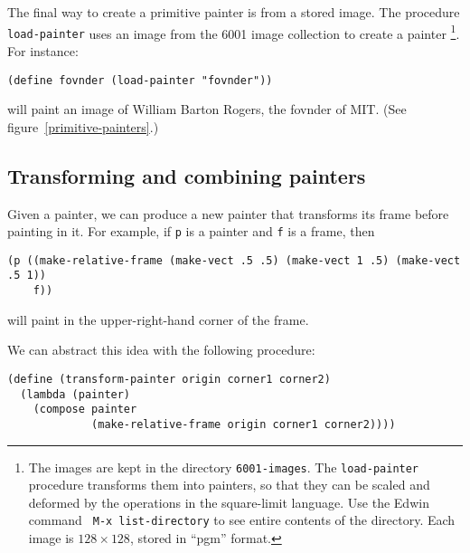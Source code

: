 The final way to create a primitive painter is from a stored image.
The procedure {\tt load-painter} uses an image from the 6001 image
collection to create a painter
\footnote{The images are kept in the
directory {\tt 6001-images}.  The {\tt load-painter} procedure transforms
them into painters, so that they can be scaled and deformed by the
operations in the square-limit language.  Use the Edwin command {\tt
M-x list-directory} to see entire contents of the directory.  Each
image is $128\times 128$, stored in ``pgm'' format.}.
For instance:

\begin{verbatim}
(define fovnder (load-painter "fovnder"))
\end{verbatim}

\noindent
will paint an image of William Barton Rogers, the {\sc fovnder} of MIT.
(See figure~\ref{primitive-painters}.) 



\subsection{Transforming and combining painters}

Given a painter, we can produce a new painter that transforms its
frame before painting in it.
For example, if {\tt p} is a painter and {\tt f} is a frame, then\\
\begin{verbatim}
(p ((make-relative-frame (make-vect .5 .5) (make-vect 1 .5) (make-vect .5 1))
    f))
\end{verbatim}

\noindent
will paint in the upper-right-hand corner of the frame.

We can abstract this idea with the following procedure:

\begin{verbatim}
(define (transform-painter origin corner1 corner2)
  (lambda (painter)
    (compose painter
             (make-relative-frame origin corner1 corner2))))
\end{verbatim}

